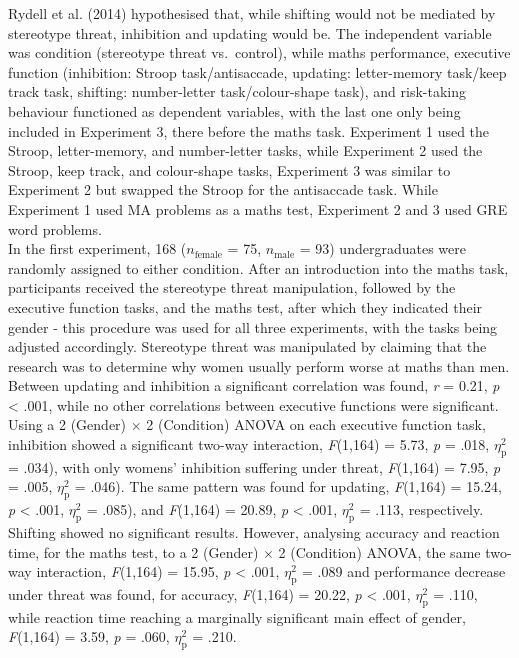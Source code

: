\documentclass[
  stu,floatsintext]{apa7}
\begin{document}
Rydell et al. (2014) hypothesised that, while shifting would not be mediated by stereotype threat, inhibition and updating would be.
The independent variable was condition (stereotype threat vs.~control), while maths performance, executive function (inhibition: Stroop task/antisaccade, updating: letter-memory task/keep track task, shifting: number-letter task/colour-shape task), and risk-taking behaviour functioned as dependent variables, with the last one only being included in Experiment 3, there before the maths task.
Experiment 1 used the Stroop, letter-memory, and number-letter tasks, while Experiment 2 used the Stroop, keep track, and colour-shape tasks, Experiment 3 was similar to Experiment 2 but swapped the Stroop for the antisaccade task.
While Experiment 1 used MA problems as a maths test, Experiment 2 and 3 used GRE word problems.\\
In the first experiment, 168 (\(n_{\text{female}}\) = 75, \(n_{\text{male}}\) = 93) undergraduates were randomly assigned to either condition.
After an introduction into the maths task, participants received the stereotype threat manipulation, followed by the executive function tasks, and the maths test, after which they indicated their gender - this procedure was used for all three experiments, with the tasks being adjusted accordingly.
Stereotype threat was manipulated by claiming that the research was to determine why women usually perform worse at maths than men.\\
Between updating and inhibition a significant correlation was found, \emph{r} = 0.21, \emph{p} \textless{} .001, while no other correlations between executive functions were significant.
Using a 2 (Gender) \(\times\) 2 (Condition) ANOVA on each executive function task, inhibition showed a significant two-way interaction, \emph{F}(1,164) = 5.73, \emph{p} = .018, \(\eta^{2}_{\text{p}}\) = .034), with only womens' inhibition suffering under threat, \emph{F}(1,164) = 7.95, \emph{p} = .005, \(\eta^{2}_{\text{p}}\) = .046).
The same pattern was found for updating, \emph{F}(1,164) = 15.24, \emph{p} \textless{} .001, \(\eta^{2}_{\text{p}}\) = .085), and \emph{F}(1,164) = 20.89, \emph{p} \textless{} .001, \(\eta^{2}_{\text{p}}\) = .113, respectively.
Shifting showed no significant results.
However, analysing accuracy and reaction time, for the maths test, to a 2 (Gender) \(\times\) 2 (Condition) ANOVA, the same two-way interaction, \emph{F}(1,164) = 15.95, \emph{p} \textless{} .001, \(\eta^{2}_{\text{p}}\) = .089 and performance decrease under threat was found, for accuracy, \emph{F}(1,164) = 20.22, \emph{p} \textless{} .001, \(\eta^{2}_{\text{p}}\) = .110, while reaction time reaching a marginally significant main effect of gender, \emph{F}(1,164) = 3.59, \emph{p} = .060, \(\eta^{2}_{\text{p}}\) = .210.
\end{document}

